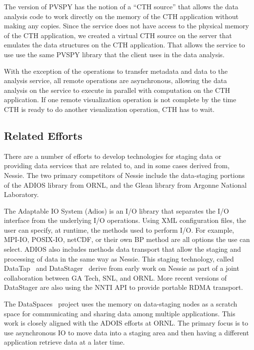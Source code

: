 The \insitu version of PVSPY has the notion of a ``CTH source'' that allows
the data analysis code to work directly on the memory of the CTH
application without making any copies.  Since the \intransit service does
not have access to the physical memory of the CTH application, we created a
virtual CTH source on the server that emulates the data structures on the
CTH application.  That allows the service to use use the same PVSPY library
that the client uses in the \insitu data analysis.

With the exception of the operations to transfer metadata and data to the
analysis service, all remote operations are asynchronous, allowing the data
analysis on the service to execute in parallel with computation on the CTH
application.  If one remote visualization operation is not complete by the
time CTH is ready to do another visualization operation, CTH has to wait.


\subsection{Related Efforts}

There are a number of efforts to develop technologies for staging data or 
providing data services that are related to, and in some cases derived from,
Nessie.  The two primary competitors of Nessie include the data-staging
portions of the ADIOS library from ORNL, and the Glean library from Argonne
National Laboratory. 

The Adaptable IO System (Adios) is an I/O library that separates the I/O
interface from the underlying I/O operations.  Using XML configuration 
files, the user can specify, at runtime, the methods used to perform I/O.
For example, MPI-IO, POSIX-IO, netCDF, or their own BP method are all options
the use can select.  ADIOS also includes methods data transport that allow
the staging and processing of data in the same way as Nessie.  This staging
technology, called DataTap~\cite{datatap2009cluster} and
DataStager~\cite{abbasi:2010:datastager} derive from early work on Nessie as
part of a joint collaboration between GA Tech, SNL, and ORNL.  More recent
versions of DataStager are also using the NNTI API to provide portable 
RDMA transport. 

The DataSpaces~\cite{docan:2010:dataspaces} project uses the memory on
data-staging nodes as a scratch space for communicating and sharing 
data among multiple applications.  This work is closely aligned with the 
ADOIS efforts at ORNL.  The primary focus is to use asynchronous IO to
move data into a staging area and then having a
different application retrieve data at a later time.

